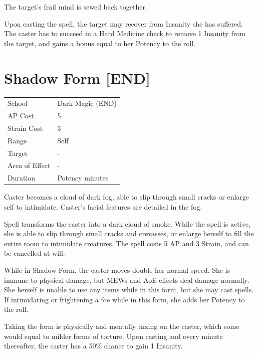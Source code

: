 \documentclass[11pt,a4paper,twocolumn]{book}
\begin{document}
\medskip

The target's frail mind is sewed back together.

Upon casting the spell, the target may recover from Insanity she has suffered. The caster has to succeed in a Hard Medicine check to remove 1 Insanity from the target, and gains a bonus equal to her Potency to the roll.

\vfill

\section*{Shadow Form [END]}

{
	\begin{tabu} to 75mm{| X[l,4] | X[l,7] |}
		\hline
		School 			& Dark Magic (END) 		\\
        AP Cost	      	& 5 					\\
        Strain Cost     & 3 					\\
        Range     		& Self					\\
        Target      	& -						\\
        Area of Effect  & -  	 				\\
        Duration     	& Potency minutes		\\ \hline
	\end{tabu}
		
}

\medskip

Caster becomes a cloud of dark fog, able to slip through small cracks or enlarge self to intimidate. Caster's facial features are detailed in the fog. 	

Spell transforms the caster into a dark cloud of smoke. While the spell is active, she is able to slip through small cracks and crevasses, or enlarge herself to fill the entire room to intimidate creatures. The spell costs 5 AP and 3 Strain, and can be cancelled at will.

While in Shadow Form, the caster moves double her normal speed. She is immune to physical damage, but MEWs and AoE effects deal damage normally. She herself is unable to use any items while in this form, but she may cast spells. If intimidating or frightening a foe while in this form, she adds her Potency to the roll.

Taking the form is physically and mentally taxing on the caster, which some would equal to milder forms of torture. Upon casting and every minute thereafter, the caster has a 50\% chance to gain 1 Insanity.
\end{document}
